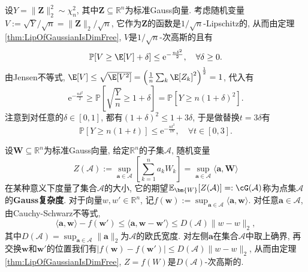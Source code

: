 \begin{example}\label{ex:tailBdofChiSquare}
	设$Y = \|\bm{Z}\|_2^2 \sim \chi^2_n$, 其中$\bm{Z} \subseteq \mathbb{R}^n$为标准Gauss向量. 
	考虑随机变量$V := \sqrt{Y} / \sqrt{n} = \|\bm{Z}\|_2 / \sqrt{n}$, 它作为$\bm{Z}$的函数是$1/\sqrt{n}$-Lipschitz的, 从而由定理\ref{thm:LipOfGaussianIsDimFree}, $V$是$1/\sqrt{n}$-次高斯的且有 
	\begin{equation*}
		\mathbb{P}[V \geq \E[V] + \delta]
		\leq \mathrm{e}^{-\frac{n \delta^2}{2}}, 
		\quad \forall \delta \geq 0.
	\end{equation*}
	由Jensen不等式, $\E[V] \leq \sqrt{\E[V^2]} = \left(\frac{1}{n} \sum_k \E[Z_k]^2 \right)^{\frac12} = 1$, 代入有
	\begin{equation*}
		\mathrm{e}^{-\frac{n \delta^2}{2}}
		\geq \mathbb{P}\left[\sqrt{\frac{Y}{n}} \geq 1 + \delta \right]
		= \mathbb{P}\left[Y \geq n(1 + \delta)^2 \right]. 
	\end{equation*}
	注意到对任意的$\delta \in [0,1]$, 都有$(1+\delta)^2 \leq 1+3\delta$, 于是做替换$t = 3\delta$有
	\begin{equation*}
		\mathbb{P}[Y \geq n(1+t)] 
		\leq \mathrm{e}^{- \frac{nt^2}{18}}, \quad \forall t \in [0,3]. 
	\end{equation*}
\end{example}

\begin{example}[点集的Gauss复杂度]
	设$\bm{W} \subseteq \mathbb{R}^n$为标准Gauss向量, 给定$\mathbb{R}^n$的子集$\mathcal{A}$, 随机变量
	\begin{equation*}
		Z(\mathcal{A})
		:= \sup_{\bm{a} \in \mathcal{A}} \left[ \sum_{k=1}^n a_k W_k \right]
		= \sup_{\bm{a} \in \mathcal{A}} \langle \bm{a}, \bm{W} \rangle
	\end{equation*}
	在某种意义下度量了集合$\mathcal{A}$的大小, 它的期望$\mathbb{E}_{\bm{W}}[Z(\mathcal{A})] =: \cG(\mathcal{A})$称为点集$\mathcal{A}$的\textbf{Gauss复杂度}. 
	对于向量$w, w' \in \mathbb{R}^n$, 记$f(\bm{w}) := \sup_{\bm{a} \in \mathcal{A}} \langle \bm{a}, \bm{w} \rangle$. 
	对任意$\bm{a} \in \mathcal{A}$, 由Cauchy-Schwarz不等式, 
	\begin{equation*}
		\langle \bm{a}, \bm{w} \rangle - f(\bm{w}') 
		\leq \langle \bm{a}, \bm{w} - \bm{w}' \rangle
		\leq D(\mathcal{A}) \|w - w\|_2, 
	\end{equation*}
	其中$D(\mathcal{A}) = \sup_{\bm{a} \in \mathcal{A}} \|\bm{a}\|_2$为$\mathcal{A}$的欧氏宽度. 
	对左侧$\bm{a}$在集合$\mathcal{A}$中取上确界, 再交换$\bm{w}$和$\bm{w}'$的位置我们有$|f(\bm{w}) - f(\bm{w}')| \leq D(\mathcal{A}) \|w - w\|_2$, 从而由定理\ref{thm:LipOfGaussianIsDimFree}, $Z = f(W)$是$D(\mathcal{A})$-次高斯的. 
\end{example}

